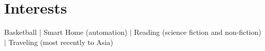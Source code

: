 \section{\textbf{Interests}}
\begin{itemize}[leftmargin=0.1in, label={}]
   \small{\item{
    Basketball $|$ Smart Home (automation) $|$ Reading (science fiction and non-fiction) $|$ Traveling (most recently to Asia)
   }}
\end{itemize}
\vspace{-16pt} 